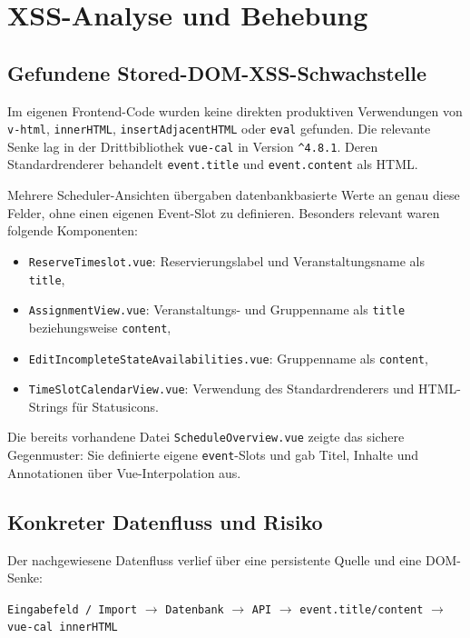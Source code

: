 \section{XSS-Analyse und Behebung}
\label{sec:xss}

\subsection{Gefundene Stored-DOM-XSS-Schwachstelle}

Im eigenen Frontend-Code wurden keine direkten produktiven
Verwendungen von \texttt{v-html}, \texttt{innerHTML},
\texttt{insertAdjacentHTML} oder \texttt{eval} gefunden. Die
relevante Senke lag in der Drittbibliothek \texttt{vue-cal} in
Version \texttt{\^{}4.8.1}. Deren Standardrenderer behandelt
\texttt{event.title} und \texttt{event.content} als HTML.

Mehrere Scheduler-Ansichten übergaben datenbankbasierte Werte an
genau diese Felder, ohne einen eigenen Event-Slot zu definieren.
Besonders relevant waren folgende Komponenten:

\begin{itemize}
  \item \texttt{ReserveTimeslot.vue}: Reservierungslabel und
    Veranstaltungsname als \texttt{title},
  \item \texttt{AssignmentView.vue}: Veranstaltungs- und Gruppenname
    als \texttt{title} beziehungsweise \texttt{content},
  \item \texttt{EditIncompleteStateAvailabilities.vue}: Gruppenname
    als \texttt{content},
  \item \texttt{TimeSlotCalendarView.vue}: Verwendung des
    Standardrenderers und HTML-Strings für Statusicons.
\end{itemize}

Die bereits vorhandene Datei \texttt{ScheduleOverview.vue} zeigte das
sichere Gegenmuster: Sie definierte eigene \texttt{event}-Slots und
gab Titel, Inhalte und Annotationen über Vue-Interpolation aus.

\subsection{Konkreter Datenfluss und Risiko}

Der nachgewiesene Datenfluss verlief über eine persistente Quelle und
eine DOM-Senke:

\begin{center}
  \texttt{Eingabefeld / Import} $\rightarrow$ \texttt{Datenbank}
  $\rightarrow$ \texttt{API} $\rightarrow$
  \texttt{event.title/content} $\rightarrow$ \texttt{vue-cal innerHTML}
\end{center}

